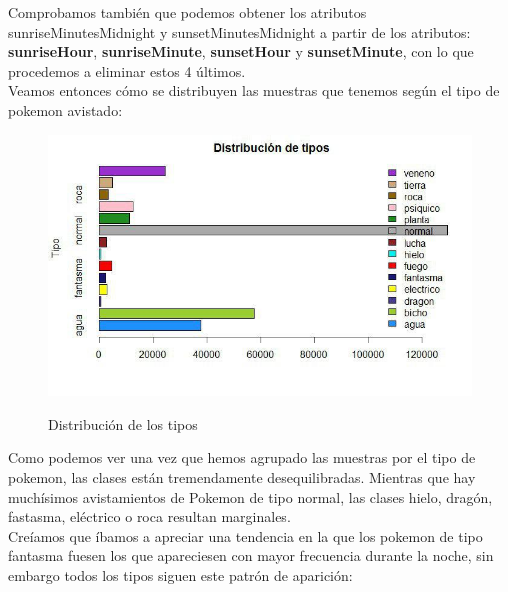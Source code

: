Comprobamos también que podemos obtener los atributos sunriseMinutesMidnight y sunsetMinutesMidnight a partir de los atributos: \textbf{sunriseHour}, \textbf{sunriseMinute}, \textbf{sunsetHour} y \textbf{sunsetMinute}, con lo que procedemos a eliminar estos 4 últimos.\\

Veamos entonces cómo se distribuyen las muestras que tenemos según el tipo de pokemon avistado:

\begin{figure}[H] %
\centering
\includegraphics[scale=0.8]{img/tipos.jpg}  %
\label{img/tipos.jpg}
\caption{Distribución de los tipos}
\end{figure}

Como podemos ver una vez que hemos agrupado las muestras por el tipo de pokemon, las clases están tremendamente desequilibradas. Mientras que hay muchísimos avistamientos de Pokemon de tipo normal, las clases hielo, dragón, fastasma, eléctrico o roca resultan marginales.\\

Creíamos que íbamos a apreciar una tendencia en la que los pokemon de tipo fantasma fuesen los que apareciesen con mayor frecuencia durante la noche, sin embargo todos los tipos siguen este patrón de aparición:

